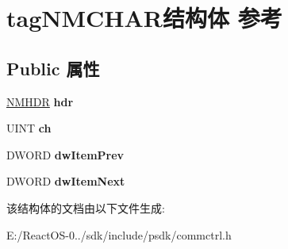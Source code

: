 \hypertarget{structtag_n_m_c_h_a_r}{}\section{tag\+N\+M\+C\+H\+A\+R结构体 参考}
\label{structtag_n_m_c_h_a_r}
\subsection*{Public 属性}
\begin{DoxyCompactItemize}
\item 
\mbox{\label{structtag_n_m_c_h_a_r_ac938650afcb4670288434c202cc6d072}} 
\hyperlink{structtag_n_m_h_d_r}{N\+M\+H\+DR} {\bfseries hdr}
\item 
\mbox{\label{structtag_n_m_c_h_a_r_a0b71e9130525f017f77fc826fe520a14}} 
U\+I\+NT {\bfseries ch}
\item 
\mbox{\label{structtag_n_m_c_h_a_r_a0ed4c1278458aba7d79117107a9d7717}} 
D\+W\+O\+RD {\bfseries dw\+Item\+Prev}
\item 
\mbox{\label{structtag_n_m_c_h_a_r_ab4905651fadd27cc839693edc804b187}} 
D\+W\+O\+RD {\bfseries dw\+Item\+Next}
\end{DoxyCompactItemize}


该结构体的文档由以下文件生成\+:\begin{DoxyCompactItemize}
\item 
E\+:/\+React\+O\+S-\/0../sdk/include/psdk/commctrl.\+h\end{DoxyCompactItemize}
